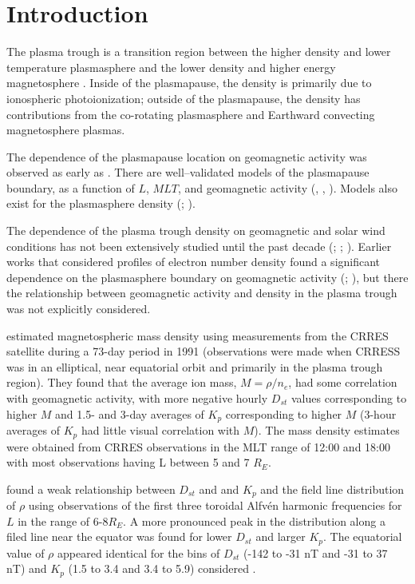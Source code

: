 \documentclass[10pt,twocolumn]{article}
\begin{document}
\saythanks

\section{Introduction}

The plasma trough is a transition region between the higher density and lower temperature plasmasphere and the lower density and higher energy magnetosphere \citep{Mayr1968ModelMagnetosphereTemperature}.  Inside of the plasmapause, the density is primarily due to ionospheric photoionization; outside of the plasmapause, the density has contributions from the co-rotating plasmasphere and Earthward convecting magnetosphere plasmas.

The dependence of the plasmapause location on geomagnetic activity was observed as early as \cite{Carpenter1966}.  There are well--validated models of the plasmapause boundary, as a function of $L$, $MLT$, and geomagnetic activity (\cite{LemaireEarthsPlasmasphere}, \cite{Moldwin2002ModelPlasmapause}, \cite{OBrien2003EmpiricalPlasmapause}).  Models also exist for the plasmasphere density (\cite{Gallagher1988EmpiricalModelPlasmasphere}; \cite{LemaireEarthsPlasmasphere}).

The dependence of the plasma trough density on geomagnetic and solar wind conditions has not been extensively studied until the past decade (\cite{Takahashi2006}; \cite{Takahashi2010}; \cite{Denton2016}). Earlier works that considered profiles of electron number density found a significant dependence on the plasmasphere boundary on geomagnetic activity (\cite{Chappell1970}; \cite{Anderson1993}), but there the relationship between geomagnetic activity and density in the plasma trough was not explicitly considered.

\cite{Takahashi2006} estimated magnetospheric mass density using measurements from the CRRES satellite during a 73-day period in 1991 (observations were made when CRRESS was in an elliptical, near equatorial orbit and primarily in the plasma trough region). They found that the average ion mass, $M=\rho/n_e$, had some correlation with geomagnetic activity, with more negative hourly $D_{st}$ values corresponding to higher $M$ and 1.5- and 3-day averages of $K_p$ corresponding to higher $M$ (3-hour averages of $K_p$ had little visual correlation with $M$). The mass density estimates were obtained from CRRES observations in the MLT range of 12:00 and 18:00 with most observations having L between 5 and 7 $R_E$.

\cite{Denton2006} found a weak relationship between $D_{st}$ and and $K_p$ and the field line distribution of $\rho$ using observations of the first three toroidal Alfv\'en harmonic frequencies for $L$ in the range of 6-8$R_E$.  A more pronounced peak in the distribution along a filed line near the equator was found for lower $D_{st}$ and larger $K_p$.  The equatorial value of $\rho$ appeared identical for the bins of $D_{st}$ (-142 to -31 nT and -31 to 37 nT) and $K_p$ (1.5 to 3.4 and 3.4 to 5.9) considered .
\end{document}
